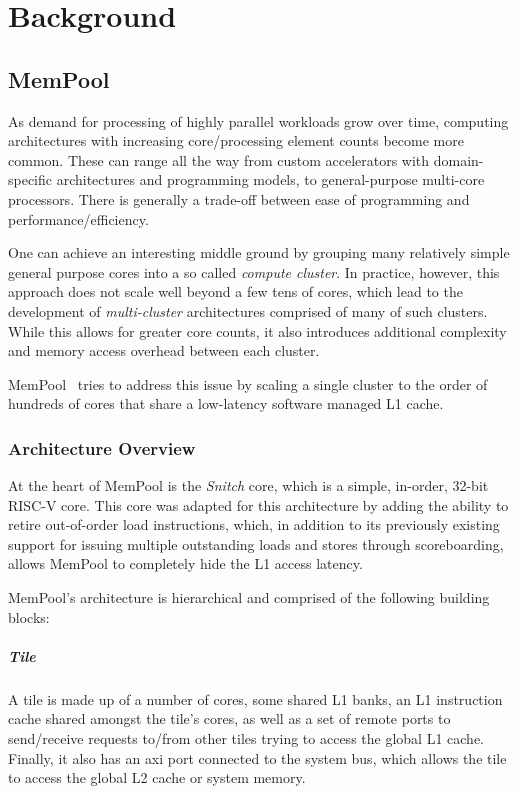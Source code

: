 \chapter{Background}
\label{ch:background}

\section{MemPool}
\label{sec:mempool}

As demand for processing of highly parallel workloads grow over time, computing architectures
with increasing core/processing element counts become more common. These can range all the way
from custom accelerators with domain-specific architectures and programming models, to
general-purpose multi-core processors. There is generally a trade-off between ease of programming
and performance/efficiency.

One can achieve an interesting middle ground by grouping many relatively simple general purpose
cores into a so called \emph{compute cluster}. In practice, however, this approach does not scale
well beyond a few tens of cores, which lead to the development of \emph{multi-cluster} architectures
comprised of many of such clusters. While this allows for greater core counts, it also introduces
additional complexity and memory access overhead between each cluster.

MemPool~\cite{mempool} tries to address this issue by scaling a single cluster to the order of
hundreds of cores that share a low-latency software managed L1 cache.

\subsection{Architecture Overview}
\label{subsec:mempool_architecture}

At the heart of MemPool is the \emph{Snitch} core, which is a simple, in-order, 32-bit RISC-V core.
This core was adapted for this architecture by adding the ability to retire out-of-order load
instructions, which, in addition to its previously existing support for issuing multiple outstanding
loads and stores through scoreboarding, allows MemPool to completely hide the L1 access latency.

MemPool's architecture is hierarchical and comprised of the following building blocks:

\paragraph{Tile} A tile is made up of a number of cores, some shared L1 banks, an L1 instruction
cache shared amongst the tile's cores, as well as a set of remote ports to send/receive requests
to/from other tiles trying to access the global L1 cache. Finally, it also has an \gls{axi} port
connected to the system bus, which allows the tile to access the global L2 cache or system memory.

